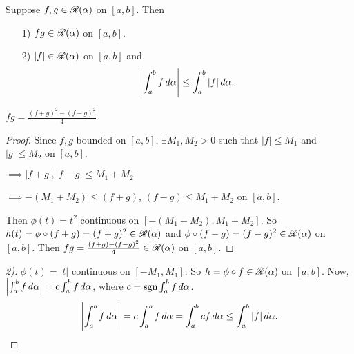 \documentclass[]{article}
\begin{document}
\begin{theorem}
	Suppose $f,g\in\mathscr{R}(\alpha)$ on $[a,b]$. Then
	\begin{enumerate}
		\item[1)] $fg\in\mathscr{R}(\alpha)$ on $[a,b]$.
		\item[2)] $|f|\in\mathscr{R}(\alpha)$ on $[a,b]$ and
			$$ \left|\int_a^b f\,d\alpha\right| \leq \int_a^b |f|\,d\alpha .$$
	\end{enumerate}
\end{theorem}
\begin{recall}
	$ fg = \frac{(f+g)^2-(f-g)^2}4 $
\end{recall}
\begin{proof}
	Since $f,g$ bounded on $[a,b]$, $\exists M_1,M_2>0$ such that $|f|\leq M_1$ and $|g|\leq M_2$ on $[a,b]$.

	$\implies |f+g|, |f-g| \leq M_1+M_2$

	$\implies -(M_1+M_2) \leq (f+g)$, $(f-g) \leq M_1 + M_2$ on $[a,b]$.

	Then $\phi(t) = t^2$ continuous on $[-(M_1+M_2),M_1+M_2]$.
	So $h(t) = \phi\circ(f+g) = (f+g)^2\in\mathscr{R}(\alpha)$ and $\phi\circ(f-g)=(f-g)^2\in\mathscr{R}(\alpha)$ on $[a,b]$.
	Then $fg = \frac{(f+g)-(f-g)^2}4\in\mathscr{R}(\alpha)$ on $[a,b]$.
\end{proof}
\begin{proof}
	[2)] $\phi(t) = |t|$ continuous on $[-M_1,M_1]$.
	So $h=\phi\circ f\in\mathscr{R}(\alpha)$ on $[a,b]$.
	Now, $\left|\int_a^b f\,d\alpha\right| = c\int_a^b f\,d\alpha$, where $c = \text{sgn}\int_a^b f\,d\alpha$.
	$$ \left|\int_a^b f\,d\alpha\right| = c\int_a^b f\,d\alpha = \int_a^b cf\,d\alpha \leq \int_a^b |f|\,d\alpha. $$
\end{proof}
\end{document}
